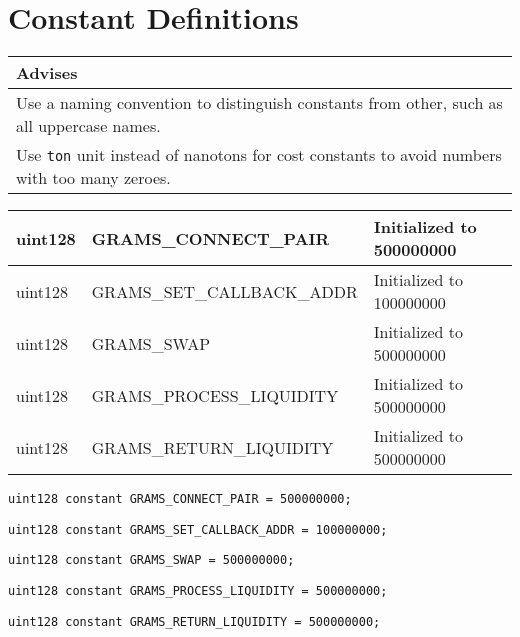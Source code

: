 \section{Constant Definitions}


\ifsoldraft
\noindent\begin{tabular}{|p{12cm}|}\hline
\rowcolor{green}Advises
\\\hline
Use a naming convention to distinguish constants from other, such as all uppercase names.
\\\hline
Use \verb+ton+ unit instead of nanotons for cost constants to avoid numbers with too many zeroes.
\\\hline\end{tabular}
\fi

\ifsoltables
\noindent\begin{tabular}{|l|l|p{5cm}|}\hline
uint128 & GRAMS\_{}CONNECT\_{}PAIR & Initialized to 500000000  \\\hline
uint128 & GRAMS\_{}SET\_{}CALLBACK\_{}ADDR & Initialized to 100000000  \\\hline
uint128 & GRAMS\_{}SWAP & Initialized to 500000000  \\\hline
uint128 & GRAMS\_{}PROCESS\_{}LIQUIDITY & Initialized to 500000000  \\\hline
uint128 & GRAMS\_{}RETURN\_{}LIQUIDITY & Initialized to 500000000  \\\hline
\end{tabular}
\fi


\begin{lstlisting}[firstnumber=23]
  uint128 constant GRAMS_CONNECT_PAIR = 500000000;
\end{lstlisting}

\begin{lstlisting}[firstnumber=24]
  uint128 constant GRAMS_SET_CALLBACK_ADDR = 100000000;
\end{lstlisting}

\begin{lstlisting}[firstnumber=25]
  uint128 constant GRAMS_SWAP = 500000000;
\end{lstlisting}

\begin{lstlisting}[firstnumber=26]
  uint128 constant GRAMS_PROCESS_LIQUIDITY = 500000000;
\end{lstlisting}

\begin{lstlisting}[firstnumber=27]
  uint128 constant GRAMS_RETURN_LIQUIDITY = 500000000;
\end{lstlisting}

